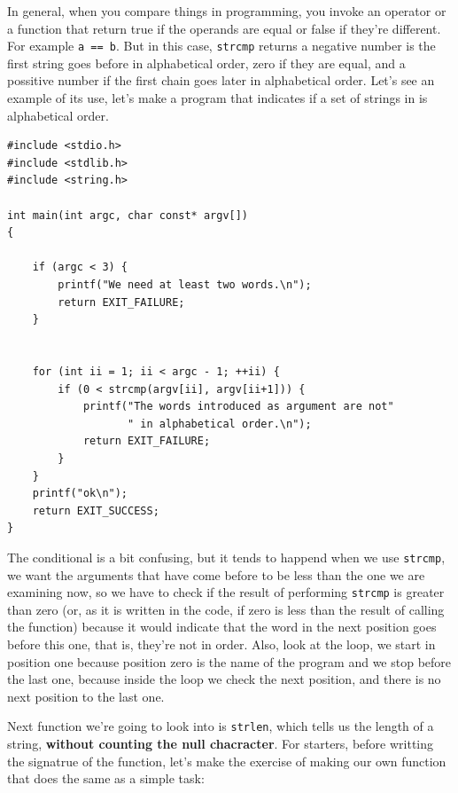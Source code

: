\documentclass[a4paper]{article}
\begin{document}
In general, when you compare things in programming, you invoke an operator or
a function that return true if the operands are equal or false if they're
different. For example \verb!a == b!. But in this case, \verb!strcmp! returns a
negative number is the first string goes before in alphabetical order, zero if
they are equal, and a possitive number if the first chain goes later in
alphabetical order. Let's see an example of its use, let's make a program that
indicates if a set of strings in is alphabetical order.

\noindent
\begin{minipage}[H]{\linewidth}
\mbox{}
\begin{lstlisting}[style=C,
caption={Signature of function \texttt{strcmp}},
label={lst:strcmp}]
#include <stdio.h>
#include <stdlib.h>
#include <string.h>

int main(int argc, char const* argv[])
{

    if (argc < 3) {
        printf("We need at least two words.\n");
        return EXIT_FAILURE;
    }


    for (int ii = 1; ii < argc - 1; ++ii) {
        if (0 < strcmp(argv[ii], argv[ii+1])) {
            printf("The words introduced as argument are not"
                   " in alphabetical order.\n");
            return EXIT_FAILURE;
        }
    }
    printf("ok\n");
    return EXIT_SUCCESS;
}
\end{lstlisting}
\end{minipage}

The conditional is a bit confusing, but it tends to happend when we use
\verb!strcmp!, we want the arguments that have come before to be less than the
one we are examining now, so we have to check if the result of performing
\verb!strcmp! is greater than zero (or, as it is written in the code, if zero is
less than the result of calling the function) because it would indicate that
the word in the next position goes before this one, that is, they're not in
order. Also, look at the loop, we start in position one because position zero is
the name of the program and we stop before the last one, because inside the loop
we check the next position, and there is no next position to the last one.

Next function we're going to look into is \verb!strlen!, which tells us the
length of a string, \textbf{without counting the null chacracter}. For starters,
before writting the signatrue of the function, let's make the exercise of
making our own function that does the same as a simple task:
\end{document}
